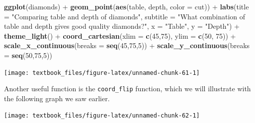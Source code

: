 \documentclass[]{tufte-book}
\newenvironment{Shaded}{}{}
\newcommand{\DataTypeTok}[1]{\textcolor[rgb]{0.56,0.13,0.00}{#1}}
\newcommand{\DecValTok}[1]{\textcolor[rgb]{0.25,0.63,0.44}{#1}}
\newcommand{\KeywordTok}[1]{\textcolor[rgb]{0.00,0.44,0.13}{\textbf{#1}}}
\newcommand{\NormalTok}[1]{#1}
\newcommand{\OperatorTok}[1]{\textcolor[rgb]{0.40,0.40,0.40}{#1}}
\newcommand{\StringTok}[1]{\textcolor[rgb]{0.25,0.44,0.63}{#1}}
\begin{document}
\begin{Shaded}
\begin{Highlighting}[]
\KeywordTok{ggplot}\NormalTok{(diamonds) }\OperatorTok{+}
\StringTok{    }\KeywordTok{geom_point}\NormalTok{(}\KeywordTok{aes}\NormalTok{(table, depth, }\DataTypeTok{color =}\NormalTok{ cut)) }\OperatorTok{+}\StringTok{ }
\StringTok{    }\KeywordTok{labs}\NormalTok{(}\DataTypeTok{title =} \StringTok{"Comparing table and depth of diamonds"}\NormalTok{,}
         \DataTypeTok{subtitle =} \StringTok{"What combination of table}
\StringTok{         and depth gives good quality diamonds?"}\NormalTok{,}
         \DataTypeTok{x =} \StringTok{"Table"}\NormalTok{,}
         \DataTypeTok{y =} \StringTok{"Depth"}\NormalTok{) }\OperatorTok{+}
\StringTok{    }\KeywordTok{theme_light}\NormalTok{() }\OperatorTok{+}
\StringTok{    }\KeywordTok{coord_cartesian}\NormalTok{(}\DataTypeTok{xlim =} \KeywordTok{c}\NormalTok{(}\DecValTok{45}\NormalTok{,}\DecValTok{75}\NormalTok{), }\DataTypeTok{ylim =} \KeywordTok{c}\NormalTok{(}\DecValTok{50}\NormalTok{, }\DecValTok{75}\NormalTok{)) }\OperatorTok{+}
\StringTok{    }\KeywordTok{scale_x_continuous}\NormalTok{(}\DataTypeTok{breaks =} \KeywordTok{seq}\NormalTok{(}\DecValTok{45}\NormalTok{,}\DecValTok{75}\NormalTok{,}\DecValTok{5}\NormalTok{)) }\OperatorTok{+}
\StringTok{    }\KeywordTok{scale_y_continuous}\NormalTok{(}\DataTypeTok{breaks =} \KeywordTok{seq}\NormalTok{(}\DecValTok{50}\NormalTok{,}\DecValTok{75}\NormalTok{,}\DecValTok{5}\NormalTok{))}
\end{Highlighting}
\end{Shaded}

\texttt{[image: textbook\_files/figure-latex/unnamed-chunk-61-1]}

Another useful function is the \texttt{coord\_flip} function, which we will illustrate with the following graph we saw earlier.

\begin{Shaded}
\end{Shaded}

\texttt{[image: textbook\_files/figure-latex/unnamed-chunk-62-1]}
\end{document}
